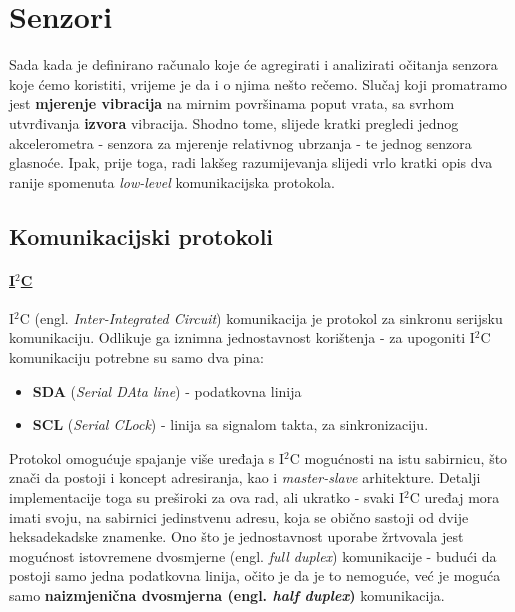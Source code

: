 \documentclass[12pt,a4paper]{article}
\begin{document}

\newpage


\section{Senzori}
	Sada kada je definirano računalo koje će agregirati i analizirati očitanja senzora koje ćemo koristiti, vrijeme je da i o njima nešto rečemo. Slučaj koji promatramo jest \textbf{mjerenje vibracija} na mirnim površinama poput vrata, sa svrhom utvrđivanja \textbf{izvora} vibracija. Shodno tome, slijede kratki pregledi jednog akcelerometra - senzora za mjerenje relativnog ubrzanja - te jednog senzora glasnoće.
	Ipak, prije toga, radi lakšeg razumijevanja slijedi vrlo kratki opis dva ranije spomenuta \textit{low-level} komunikacijska protokola.

	\subsection{Komunikacijski protokoli}
	\paragraph{\underline{I$^2$C}} %
	\label{par:i2c}
		I$^2$C (engl. \textit{Inter-Integrated Circuit}) komunikacija je protokol za sinkronu serijsku komunikaciju. Odlikuje ga iznimna jednostavnost korištenja - za upogoniti I$^2$C komunikaciju potrebne su samo dva pina:
		\begin{itemize} 
			\item \textbf{SDA} (\textit{Serial DAta line}) - podatkovna linija
			\item \textbf{SCL} (\textit{Serial CLock}) - linija sa signalom takta, za sinkronizaciju.
		\end{itemize}
		Protokol omogućuje spajanje više uređaja s I$^2$C mogućnosti na istu sabirnicu, što znači da postoji i koncept adresiranja, kao i \textit{master-slave} arhitekture. Detalji implementacije toga su preširoki za ova rad, ali ukratko - svaki I$^2$C uređaj mora imati svoju, na sabirnici jedinstvenu adresu, koja se obično sastoji od dvije heksadekadske znamenke. 
		Ono što je jednostavnost uporabe žrtvovala jest mogućnost istovremene dvosmjerne (engl. \textit{full duplex}) komunikacije - budući da postoji samo jedna podatkovna linija, očito je da je to nemoguće, već je moguća samo \textbf{naizmjenična dvosmjerna (engl. \textit{half duplex})} komunikacija.
\end{document}
